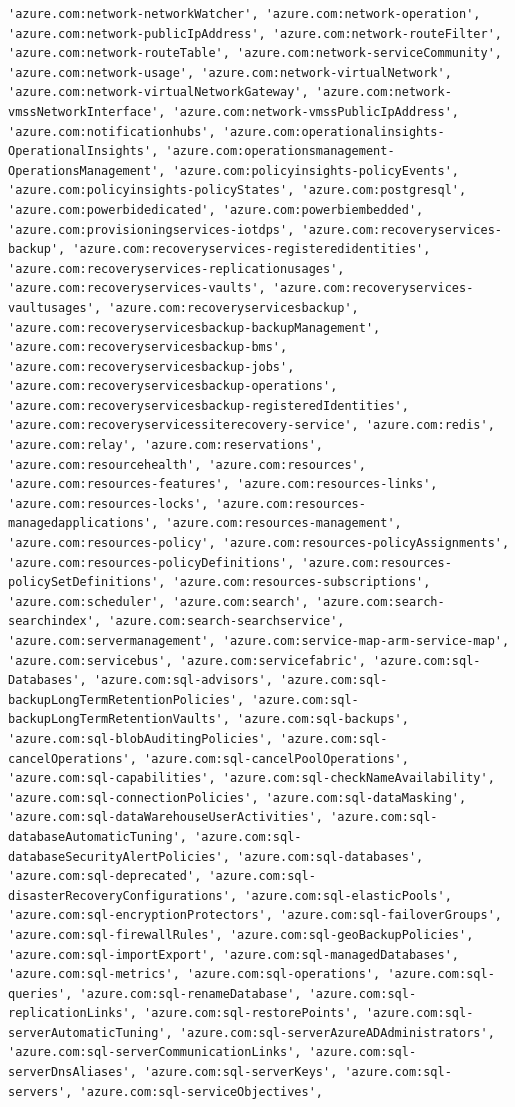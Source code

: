 \documentclass[11pt]{article}
\begin{document}
\begin{Verbatim}[commandchars=\\\{\}]
'azure.com:network-networkWatcher', 'azure.com:network-operation', 'azure.com:network-publicIpAddress', 'azure.com:network-routeFilter', 'azure.com:network-routeTable', 'azure.com:network-serviceCommunity', 'azure.com:network-usage', 'azure.com:network-virtualNetwork', 'azure.com:network-virtualNetworkGateway', 'azure.com:network-vmssNetworkInterface', 'azure.com:network-vmssPublicIpAddress', 'azure.com:notificationhubs', 'azure.com:operationalinsights-OperationalInsights', 'azure.com:operationsmanagement-OperationsManagement', 'azure.com:policyinsights-policyEvents', 'azure.com:policyinsights-policyStates', 'azure.com:postgresql', 'azure.com:powerbidedicated', 'azure.com:powerbiembedded', 'azure.com:provisioningservices-iotdps', 'azure.com:recoveryservices-backup', 'azure.com:recoveryservices-registeredidentities', 'azure.com:recoveryservices-replicationusages', 'azure.com:recoveryservices-vaults', 'azure.com:recoveryservices-vaultusages', 'azure.com:recoveryservicesbackup', 'azure.com:recoveryservicesbackup-backupManagement', 'azure.com:recoveryservicesbackup-bms', 'azure.com:recoveryservicesbackup-jobs', 'azure.com:recoveryservicesbackup-operations', 'azure.com:recoveryservicesbackup-registeredIdentities', 'azure.com:recoveryservicessiterecovery-service', 'azure.com:redis', 'azure.com:relay', 'azure.com:reservations', 'azure.com:resourcehealth', 'azure.com:resources', 'azure.com:resources-features', 'azure.com:resources-links', 'azure.com:resources-locks', 'azure.com:resources-managedapplications', 'azure.com:resources-management', 'azure.com:resources-policy', 'azure.com:resources-policyAssignments', 'azure.com:resources-policyDefinitions', 'azure.com:resources-policySetDefinitions', 'azure.com:resources-subscriptions', 'azure.com:scheduler', 'azure.com:search', 'azure.com:search-searchindex', 'azure.com:search-searchservice', 'azure.com:servermanagement', 'azure.com:service-map-arm-service-map', 'azure.com:servicebus', 'azure.com:servicefabric', 'azure.com:sql-Databases', 'azure.com:sql-advisors', 'azure.com:sql-backupLongTermRetentionPolicies', 'azure.com:sql-backupLongTermRetentionVaults', 'azure.com:sql-backups', 'azure.com:sql-blobAuditingPolicies', 'azure.com:sql-cancelOperations', 'azure.com:sql-cancelPoolOperations', 'azure.com:sql-capabilities', 'azure.com:sql-checkNameAvailability', 'azure.com:sql-connectionPolicies', 'azure.com:sql-dataMasking', 'azure.com:sql-dataWarehouseUserActivities', 'azure.com:sql-databaseAutomaticTuning', 'azure.com:sql-databaseSecurityAlertPolicies', 'azure.com:sql-databases', 'azure.com:sql-deprecated', 'azure.com:sql-disasterRecoveryConfigurations', 'azure.com:sql-elasticPools', 'azure.com:sql-encryptionProtectors', 'azure.com:sql-failoverGroups', 'azure.com:sql-firewallRules', 'azure.com:sql-geoBackupPolicies', 'azure.com:sql-importExport', 'azure.com:sql-managedDatabases', 'azure.com:sql-metrics', 'azure.com:sql-operations', 'azure.com:sql-queries', 'azure.com:sql-renameDatabase', 'azure.com:sql-replicationLinks', 'azure.com:sql-restorePoints', 'azure.com:sql-serverAutomaticTuning', 'azure.com:sql-serverAzureADAdministrators', 'azure.com:sql-serverCommunicationLinks', 'azure.com:sql-serverDnsAliases', 'azure.com:sql-serverKeys', 'azure.com:sql-servers', 'azure.com:sql-serviceObjectives', 
\end{Verbatim}
\end{document}
